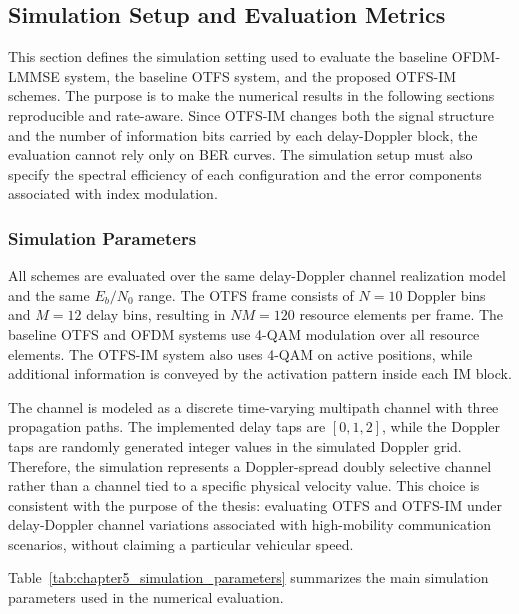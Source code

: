 
\subsection{Simulation Setup and Evaluation Metrics}

This section defines the simulation setting used to evaluate the baseline OFDM-LMMSE system, the baseline OTFS system, and the proposed OTFS-IM schemes. The purpose is to make the numerical results in the following sections reproducible and rate-aware. Since OTFS-IM changes both the signal structure and the number of information bits carried by each delay-Doppler block, the evaluation cannot rely only on BER curves. The simulation setup must also specify the spectral efficiency of each configuration and the error components associated with index modulation.

\subsubsection{Simulation Parameters}

All schemes are evaluated over the same delay-Doppler channel realization model and the same \(E_b/N_0\) range. The OTFS frame consists of \(N=10\) Doppler bins and \(M=12\) delay bins, resulting in \(NM=120\) resource elements per frame. The baseline OTFS and OFDM systems use 4-QAM modulation over all resource elements. The OTFS-IM system also uses 4-QAM on active positions, while additional information is conveyed by the activation pattern inside each IM block.

The channel is modeled as a discrete time-varying multipath channel with three propagation paths. The implemented delay taps are \([0,1,2]\), while the Doppler taps are randomly generated integer values in the simulated Doppler grid. Therefore, the simulation represents a Doppler-spread doubly selective channel rather than a channel tied to a specific physical velocity value. This choice is consistent with the purpose of the thesis: evaluating OTFS and OTFS-IM under delay-Doppler channel variations associated with high-mobility communication scenarios, without claiming a particular vehicular speed.

Table~\ref{tab:chapter5_simulation_parameters} summarizes the main simulation parameters used in the numerical evaluation.


